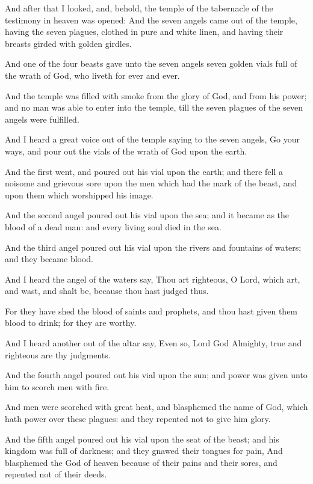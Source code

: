 \Verse And after that I looked, and, behold, the temple of the tabernacle of the testimony in heaven was opened: \Verse And the seven angels came out of the temple, having the seven plagues, clothed in pure and white linen, and having their breasts girded with golden girdles.

\Verse And one of the four beasts gave unto the seven angels seven golden vials full of the wrath of God, who liveth for ever and ever.

\Verse And the temple was filled with smoke from the glory of God, and from his power; and no man was able to enter into the temple, till the seven plagues of the seven angels were fulfilled.

\Chapter
\Verse And I heard a great voice out of the temple saying to the seven angels, Go your ways, and pour out the vials of the wrath of God upon the earth.

\Verse And the first went, and poured out his vial upon the earth; and there fell a noisome and grievous sore upon the men which had the mark of the beast, and upon them which worshipped his image.

\Verse And the second angel poured out his vial upon the sea; and it became as the blood of a dead man: and every living soul died in the sea.

\Verse And the third angel poured out his vial upon the rivers and fountains of waters; and they became blood.

\Verse And I heard the angel of the waters say, Thou art righteous, O Lord, which art, and wast, and shalt be, because thou hast judged thus.

\Verse For they have shed the blood of saints and prophets, and thou hast given them blood to drink; for they are worthy.

\Verse And I heard another out of the altar say, Even so, Lord God Almighty, true and righteous are thy judgments.

\Verse And the fourth angel poured out his vial upon the sun; and power was given unto him to scorch men with fire.

\Verse And men were scorched with great heat, and blasphemed the name of God, which hath power over these plagues: and they repented not to give him glory.

\Verse And the fifth angel poured out his vial upon the seat of the beast; and his kingdom was full of darkness; and they gnawed their tongues for pain, \Verse And blasphemed the God of heaven because of their pains and their sores, and repented not of their deeds.

